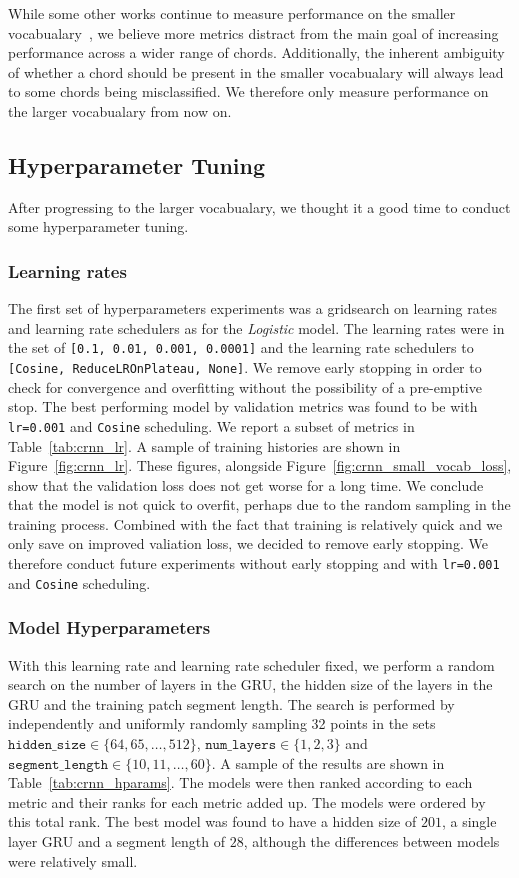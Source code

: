 While some other works continue to measure performance on the smaller vocabualary~\citep{BTC}, we believe more metrics distract from the main goal of increasing performance across a wider range of chords. Additionally, the inherent ambiguity of whether a chord should be present in the smaller vocabualary will always lead to some chords being misclassified. We therefore only measure performance on the larger vocabualary from now on.

\subsection{Hyperparameter Tuning}

After progressing to the larger vocabualary, we thought it a good time to conduct some hyperparameter tuning. 

\subsubsection{Learning rates}

The first set of hyperparameters experiments was a gridsearch on learning rates and learning rate schedulers as for the \emph{Logistic} model. The learning rates were in the set of \texttt{[0.1, 0.01, 0.001, 0.0001]} and the learning rate schedulers to \texttt{[Cosine, ReduceLROnPlateau, None]}. We remove early stopping in order to check for convergence and overfitting without the possibility of a pre-emptive stop. The best performing model by validation metrics was found to be with \texttt{lr=0.001} and \texttt{Cosine} scheduling. We report a subset of metrics in Table~\ref{tab:crnn_lr}. A sample of training histories are shown in Figure~\ref{fig:crnn_lr}. These figures, alongside Figure~\ref{fig:crnn_small_vocab_loss}, show that the validation loss does not get worse for a long time. We conclude that the model is not quick to overfit, perhaps due to the random sampling in the training process. Combined with the fact that training is relatively quick and we only save on improved valiation loss, we decided to remove early stopping. We therefore conduct future experiments without early stopping and with \texttt{lr=0.001} and \texttt{Cosine} scheduling.

\subsubsection{Model Hyperparameters}

With this learning rate and learning rate scheduler fixed, we perform a random search on the number of layers in the GRU, the hidden size of the layers in the GRU and the training patch segment length. The search is performed by independently and uniformly randomly sampling 32 points in the sets $\texttt{hidden\_size}\in\{64,65,\ldots,512\}$, $\texttt{num\_layers}\in\{1,2,3\}$ and $\texttt{segment\_length}\in\{10,11,\ldots,60\}$. A sample of the results are shown in Table~\ref{tab:crnn_hparams}. The models were then ranked according to each metric and their ranks for each metric added up. The models were ordered by this total rank. The best model was found to have a hidden size of $201$, a single layer GRU and a segment length of $28$, although the differences between models were relatively small.

